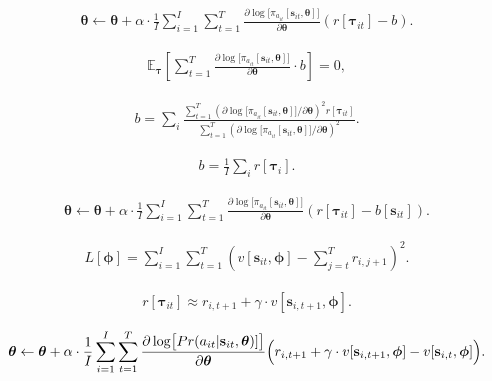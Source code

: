 \documentclass[letterpaper,twoside,openany, titlepage,oldfontcommands,titles,dvipsnames]{memoir}
\begin{document}
\begin{eqnarray}\label{eq:reinforce_baseline_update}
 \boldsymbol\theta \leftarrow \boldsymbol\theta + \alpha \cdot\frac{1}{I}\sum_{i=1}^{I} \sum_{t=1}^{T} \frac{\partial\log\bigl[\pi_{a_{it}}[\mathbf{s}_{it},\boldsymbol\theta]\bigr]}{\partial \boldsymbol\theta} \left( r[\boldsymbol\tau_{it}]- b\right).
 \end{eqnarray}

\begin{eqnarray}
 \mathbb{E}_{\boldsymbol\tau} \left[\sum_{t=1}^{T} \frac{\partial\log\bigl[\pi_{a_{it}}[\mathbf{s}_{it},\boldsymbol\theta]\bigr]}{\partial \boldsymbol\theta}\cdot b\right] = 0,
 \end{eqnarray}

\begin{eqnarray}
 b = \sum_{i}\frac{\sum_{t=1}^{T} \left({\partial\log\bigl[\pi_{a_{it}}[\mathbf{s}_{it},\boldsymbol\theta]\bigr]}/{\partial \boldsymbol\theta}\right)^2 r[\boldsymbol\tau_{it}]}{\sum_{t=1}^{T} \left({\partial\log\bigl[\pi_{a_{it}}[\mathbf{s}_{it},\boldsymbol\theta]\bigr]}/{\partial \boldsymbol\theta}\right)^2}.
 \end{eqnarray}

\begin{eqnarray}
 b = \frac{1}{I}\sum_{i} r[\boldsymbol\tau_{i}].
 \end{eqnarray}

\begin{eqnarray}\label{eq:reinforce_baseline_update2}
 \boldsymbol\theta \leftarrow \boldsymbol\theta + \alpha \cdot\frac{1}{I}\sum_{i=1}^{I} \sum_{t=1}^{T} \frac{\partial\log\bigl[\pi_{a_{it}}[\mathbf{s}_{it},\boldsymbol\theta]\bigr]}{\partial \boldsymbol\theta} \left( r[\boldsymbol\tau_{it}]- b[\mathbf{s}_{it}]\right).
 \end{eqnarray}

\begin{eqnarray}
 L[\boldsymbol\phi] = \sum_{i=1}^{I}\sum_{t=1}^{T}\left(v[\mathbf{s}_{it},\boldsymbol\phi] - \sum_{j=t}^{T} r_{i,j+1}\right)^2.
 \end{eqnarray}



\begin{eqnarray}
 r[\boldsymbol\tau_{it}] \approx r_{i,t+1} + \gamma \cdot v[\mathbf{s}_{i,t+1},\boldsymbol\phi].
 \end{eqnarray}

\begin{eqnarray}
 \boldsymbol\theta \leftarrow \boldsymbol\theta + \alpha \cdot\frac{1}{I}\sum_{i=1}^{I} \sum_{t=1}^{T} \frac{\partial\log\bigl[Pr(a_{it}|\mathbf{s}_{it},\boldsymbol\theta)]\bigr]}{\partial \boldsymbol\theta} \Bigl( r_{i,t+1} + \gamma\cdot v[\mathbf{s}_{i,t+1},\boldsymbol\phi] - v[\mathbf{s}_{i,t},\boldsymbol\phi]\Bigr).
 \end{eqnarray}
\end{document}
